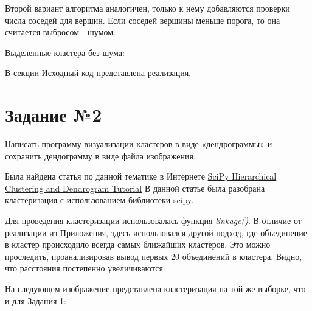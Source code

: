 \documentclass{article} %
\begin{document}
Второй вариант алгоритма аналогичен,
только к нему добавляются проверки числа соседей для вершин.
Если соседей вершины меньше порога, то она считается выбросом - шумом.

\clearpage

Выделенные кластера без шума:

\noindent{}

В секции Исходный код представлена реализация.

\section{Задание №2}

Написать программу визуализации кластеров в виде «дендрограммы» и сохранить
дендограмму в виде файла изображения.

Была найдена статья по данной тематике в Интернете
\href{https://joernhees.de/blog/2015/08/26/scipy-hierarchical-clustering-and-dendrogram-tutorial/}
{SciPy Hierarchical Clustering and Dendrogram Tutorial}
В данной статье была разобрана кластеризация с использованием библиотеки scipy.

Для проведения кластеризации использовалась функция \textit{linkage()}.
В отличие от реализации из Приложения,
здесь использовался другой подход,
где объединение в кластер происходило всегда самых ближайших кластеров.
Это можно проследить, проанализировав вывод первых 20 объединений в кластера.
Видно, что расстояния постепенно увеличиваются.

На следующем изображение представлена кластеризация на той же выборке, что и для Задания 1:

\noindent{}
\end{document}

